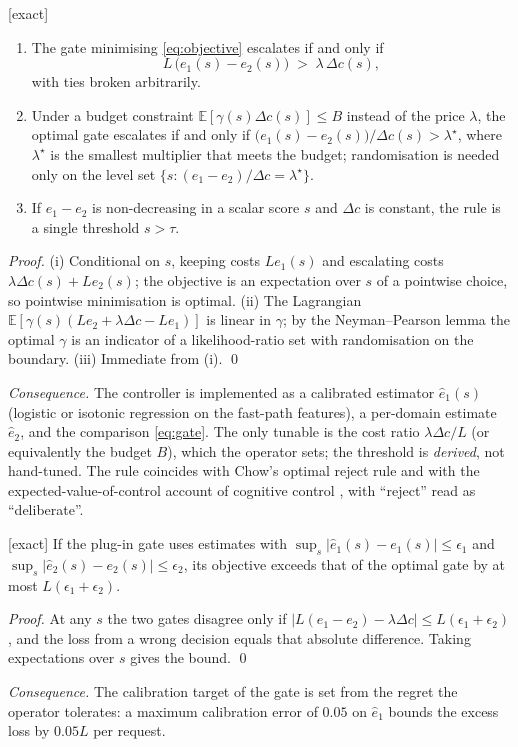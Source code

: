 \begin{theorem} \textnormal{[exact]}
\label{thm:gate}
\begin{enumerate}[label=(\roman*)]
\item The gate minimising \eqref{eq:objective} escalates if and only if
\begin{equation}
\label{eq:gate}
L\,\big(e_1(s)-e_2(s)\big)\;>\;\lambda\,\Delta c(s),
\end{equation}
with ties broken arbitrarily.
\item Under a budget constraint $\mathbb E[\gamma(s)\Delta c(s)]\le B$
instead of the price $\lambda$, the optimal gate escalates if and only if
$\big(e_1(s)-e_2(s)\big)/\Delta c(s)>\lambda^\star$, where $\lambda^\star$ is
the smallest multiplier that meets the budget; randomisation is needed only on
the level set $\{s:(e_1-e_2)/\Delta c=\lambda^\star\}$.
\item If $e_1-e_2$ is non-decreasing in a scalar score $s$ and $\Delta c$ is
constant, the rule is a single threshold $s>\tau$.
\end{enumerate}
\end{theorem}
\begin{proof}
(i) Conditional on $s$, keeping costs $Le_1(s)$ and escalating costs
$\lambda\Delta c(s)+Le_2(s)$; the objective is an expectation over $s$ of a
pointwise choice, so pointwise minimisation is optimal. (ii) The Lagrangian
$\mathbb E[\gamma(s)(L e_2+\lambda\Delta c-Le_1)]$ is linear in $\gamma$; by the
Neyman--Pearson lemma the optimal $\gamma$ is an indicator of a likelihood-ratio
set with randomisation on the boundary. (iii) Immediate from (i). \qed
\end{proof}
\emph{Consequence.} The controller is implemented as a calibrated estimator
$\hat e_1(s)$ (logistic or isotonic regression on the fast-path features),
a per-domain estimate $\hat e_2$, and the comparison \eqref{eq:gate}. The only
tunable is the cost ratio $\lambda\Delta c/L$ (or equivalently the budget $B$),
which the operator sets; the threshold is \emph{derived}, not hand-tuned. The rule coincides with Chow's optimal reject rule
\cite{chow1970reject} and with the expected-value-of-control account of
cognitive control \cite{shenhav2013evc}, with ``reject'' read as
``deliberate''.

\begin{proposition} \textnormal{[exact]}
\label{prop:miscal}
If the plug-in gate uses estimates with
$\sup_s|\hat e_1(s)-e_1(s)|\le\epsilon_1$ and
$\sup_s|\hat e_2(s)-e_2(s)|\le\epsilon_2$, its objective exceeds that of the
optimal gate by at most $L(\epsilon_1+\epsilon_2)$.
\end{proposition}
\begin{proof}
At any $s$ the two gates disagree only if
$|L(e_1-e_2)-\lambda\Delta c|\le L(\epsilon_1+\epsilon_2)$, and the loss from a
wrong decision equals that absolute difference. Taking expectations over $s$
gives the bound. \qed
\end{proof}
\emph{Consequence.} The calibration target of the gate is set from
the regret the operator tolerates: a maximum calibration error of $0.05$ on
$\hat e_1$ bounds the excess loss by $0.05L$ per request.

